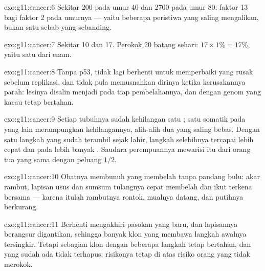 \begin{solution}{exo:g11:cancer:6}
Sekitar 200 pada umur 40 dan 2700 pada umur 80: faktor 13 bagi faktor 2
pada umurnya --- yaitu beberapa peristiwa yang saling mengalikan, bukan
satu sebab yang sebanding.
\end{solution}

\begin{solution}{exo:g11:cancer:7}
Sekitar 10 dan 17. Perokok 20 batang sehari: $17 \times 1\% = 17\%$,
yaitu satu dari enam.
\end{solution}

\begin{solution}{exo:g11:cancer:8}
Tanpa p53,  tidak lagi berhenti untuk memperbaiki  yang rusak
sebelum replikasi, dan tidak pula memusnahkan dirinya ketika
kerusakannya parah: lesinya disalin menjadi  pada tiap
pembelahannya, dan  dengan genom yang kacau tetap bertahan.
\end{solution}

\begin{solution}{exo:g11:cancer:9}
Setiap  tubuhnya sudah kehilangan satu ; satu  somatik
pada  yang lain merampungkan kehilangannya, alih-alih dua 
yang saling bebas. Dengan satu langkah yang sudah terambil sejak lahir,
langkah selebihnya tercapai lebih cepat dan pada lebih banyak .
Saudara perempuannya mewarisi  itu dari orang tua yang sama dengan
peluang $1/2$.
\end{solution}

\begin{solution}{exo:g11:cancer:10}
Obatnya membunuh  yang membelah tanpa pandang bulu:  akar rambut,
lapisan usus dan sumsum tulangnya cepat membelah dan ikut terkena
bersama  --- karena itulah rambutnya rontok, mualnya datang,
dan  putihnya berkurang.
\end{solution}

\begin{solution}{exo:g11:cancer:11}
Berhenti mengakhiri pasokan  yang baru, dan  lapisannya
berangsur digantikan, sehingga banyak klon yang membawa langkah awalnya
tersingkir. Tetapi sebagian klon dengan beberapa langkah tetap bertahan,
dan  yang sudah ada tidak terhapus; risikonya tetap di atas
risiko orang yang tidak merokok.
\end{solution}

